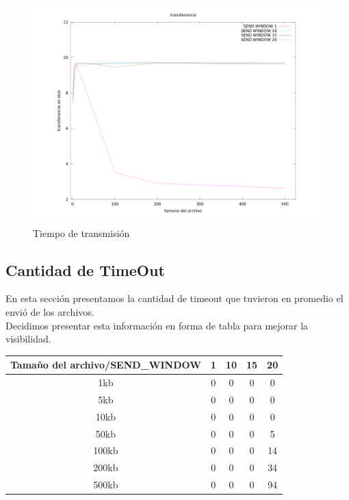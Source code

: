 \begin{figure}[h]
  \centering                                                       
          \includegraphics[width=550pt]{./datos/transferencia.png}
          \caption{Tiempo de transmisión}
          \label{fig:vt}
\end{figure}

\clearpage

\subsection{Cantidad de TimeOut}
\indent En esta sección presentamos la cantidad de timeout que tuvieron en promedio el envió de los archivos.\\
Decidimos presentar esta información en forma de tabla para mejorar la visibilidad.\\
\begin{center}
   \begin{tabular}{| c | c | c | c | c |}
    \hline
    Tamaño del archivo/SEND\_WINDOW & 1 & 10 & 15 & 20\\
    \hline
    1kb & 0 & 0 & 0 & 0 \\
    \hline
    5kb & 0 & 0 & 0 & 0 \\
    \hline
    10kb & 0 & 0 & 0 & 0\\
    \hline
    50kb & 0 & 0 & 0 & 5\\
    \hline
    100kb & 0 & 0 & 0 & 14\\
    \hline
    200kb & 0 & 0 & 0 & 34\\
    \hline
    500kb & 0 & 0 & 0 & 94\\
    \hline
  \end{tabular}
\end{center}

